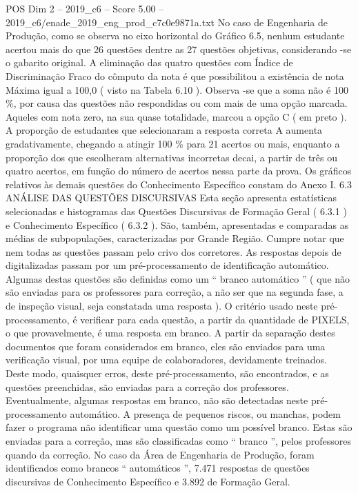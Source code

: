 \begin{textsample}{POS Dim 2 – 2019\_c6 – Score 5.00 – 2019\_c6/enade\_2019\_eng\_prod\_c7c0e9871a.txt}
No caso de Engenharia de Produção, como se observa no eixo horizontal do Gráfico 6.5, nenhum estudante acertou mais do que 26 questões dentre as 27 questões objetivas, considerando -se o gabarito original.
A eliminação das quatro questões com Índice de Discriminação Fraco do cômputo da nota é que possibilitou a existência de nota Máxima igual a 100,0 ( visto na Tabela 6.10 ).
Observa -se que a soma não é 100 \%, por causa das questões não respondidas ou com mais de uma opção marcada.
Aqueles com nota zero, na sua quase totalidade, marcou a opção C ( em preto ).
A proporção de estudantes que selecionaram a resposta correta A aumenta gradativamente, chegando a atingir 100 \% para 21 acertos ou mais, enquanto a proporção dos que escolheram alternativas incorretas decai, a partir de três ou quatro acertos, em função do número de acertos nessa parte da prova.
Os gráficos relativos às demais questões do Conhecimento Específico constam do Anexo I. 6.3 ANÁLISE DAS QUESTÕES DISCURSIVAS Esta seção apresenta estatísticas selecionadas e histogramas das Questões Discursivas de Formação Geral ( 6.3.1 ) e Conhecimento Específico ( 6.3.2 ).
São, também, apresentadas e comparadas as médias de subpopulações, caracterizadas por Grande Região.
Cumpre notar que nem todas as questões passam pelo crivo dos corretores.
As respostas depois de digitalizadas passam por um pré-processamento de identificação automático.
Algumas destas questões são definidas como um “ branco automático ” ( que não são enviadas para os professores para correção, a não ser que na segunda fase, a de inspeção visual, seja constatada uma resposta ).
O critério usado neste pré-processamento, é verificar para cada questão, a partir da quantidade de PIXELS, o que provavelmente, é uma resposta em branco.
A partir da separação destes documentos que foram considerados em branco, eles são enviados para uma verificação visual, por uma equipe de colaboradores, devidamente treinados.
Deste modo, quaisquer erros, deste pré-processamento, são encontrados, e as questões preenchidas, são enviadas para a correção dos professores.
Eventualmente, algumas respostas em branco, não são detectadas neste pré-processamento automático.
A presença de pequenos riscos, ou manchas, podem fazer o programa não identificar uma questão como um possível branco.
Estas são enviadas para a correção, mas são classificadas como “ branco ”, pelos professores quando da correção.
No caso da Área de Engenharia de Produção, foram identificados como brancos “ automáticos ”, 7.471 respostas de questões discursivas de Conhecimento Específico e 3.892 de Formação Geral.

\end{textsample}
